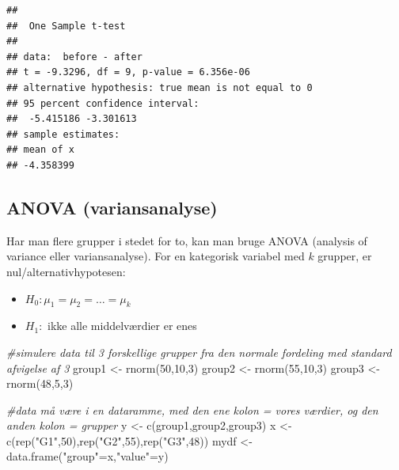 \documentclass[
]{book}
\newenvironment{Shaded}{\begin{snugshade}}{\end{snugshade}}
\newcommand{\CommentTok}[1]{\textcolor[rgb]{0.56,0.35,0.01}{\textit{#1}}}
\newcommand{\DecValTok}[1]{\textcolor[rgb]{0.00,0.00,0.81}{#1}}
\newcommand{\FunctionTok}[1]{\textcolor[rgb]{0.00,0.00,0.00}{#1}}
\newcommand{\NormalTok}[1]{#1}
\newcommand{\OtherTok}[1]{\textcolor[rgb]{0.56,0.35,0.01}{#1}}
\newcommand{\StringTok}[1]{\textcolor[rgb]{0.31,0.60,0.02}{#1}}
\providecommand{\tightlist}{%
  \setlength{\itemsep}{0pt}\setlength{\parskip}{0pt}}
\begin{document}
\begin{verbatim}
## 
##  One Sample t-test
## 
## data:  before - after
## t = -9.3296, df = 9, p-value = 6.356e-06
## alternative hypothesis: true mean is not equal to 0
## 95 percent confidence interval:
##  -5.415186 -3.301613
## sample estimates:
## mean of x 
## -4.358399
\end{verbatim}

\hypertarget{anova-variansanalyse}{%
\subsection{ANOVA (variansanalyse)}\label{anova-variansanalyse}}

Har man flere grupper i stedet for to, kan man bruge ANOVA (analysis of variance eller variansanalyse). For en kategorisk variabel med \(k\) grupper, er nul/alternativhypotesen:

\begin{itemize}
\tightlist
\item
  \(H_{0}: \mu_{1} = \mu_{2} = \ldots = \mu_{k}\)
\item
  \(H_{1}:\) ikke alle middelværdier er enes
\end{itemize}

\begin{Shaded}
\begin{Highlighting}[]
\CommentTok{\#simulere data til 3 forskellige grupper fra den normale fordeling med standard afvigelse af 3}
\NormalTok{group1 }\OtherTok{\textless{}{-}} \FunctionTok{rnorm}\NormalTok{(}\DecValTok{50}\NormalTok{,}\DecValTok{10}\NormalTok{,}\DecValTok{3}\NormalTok{)}
\NormalTok{group2 }\OtherTok{\textless{}{-}} \FunctionTok{rnorm}\NormalTok{(}\DecValTok{55}\NormalTok{,}\DecValTok{10}\NormalTok{,}\DecValTok{3}\NormalTok{)}
\NormalTok{group3 }\OtherTok{\textless{}{-}} \FunctionTok{rnorm}\NormalTok{(}\DecValTok{48}\NormalTok{,}\DecValTok{5}\NormalTok{,}\DecValTok{3}\NormalTok{)}

\CommentTok{\#data må være i en dataramme, med den ene kolon = vores værdier, og den anden kolon = grupper}
\NormalTok{y }\OtherTok{\textless{}{-}} \FunctionTok{c}\NormalTok{(group1,group2,group3)}
\NormalTok{x }\OtherTok{\textless{}{-}} \FunctionTok{c}\NormalTok{(}\FunctionTok{rep}\NormalTok{(}\StringTok{"G1"}\NormalTok{,}\DecValTok{50}\NormalTok{),}\FunctionTok{rep}\NormalTok{(}\StringTok{"G2"}\NormalTok{,}\DecValTok{55}\NormalTok{),}\FunctionTok{rep}\NormalTok{(}\StringTok{"G3"}\NormalTok{,}\DecValTok{48}\NormalTok{))}
\NormalTok{mydf }\OtherTok{\textless{}{-}} \FunctionTok{data.frame}\NormalTok{(}\StringTok{"group"}\OtherTok{=}\NormalTok{x,}\StringTok{"value"}\OtherTok{=}\NormalTok{y)}
\end{Highlighting}
\end{Shaded}
\end{document}
